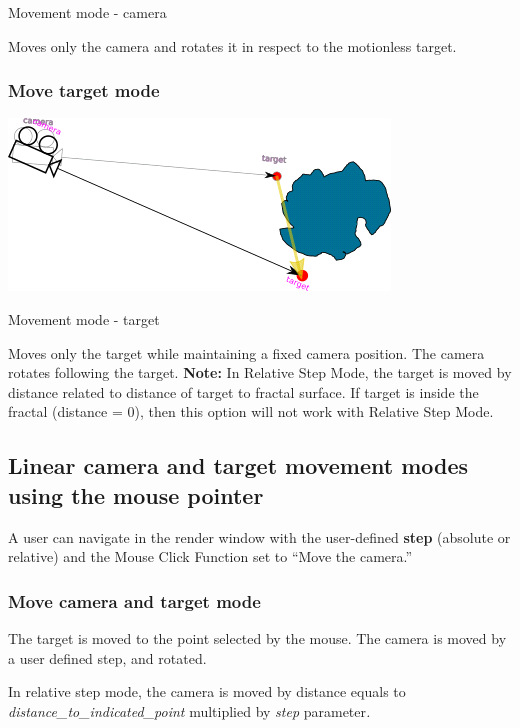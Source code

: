 Movement mode - camera

Moves only the camera and rotates it in respect to the motionless target.

\subsubsection{Move target mode}\label{move-target-mode}

\includegraphics[width=3.98819in,height=1.80208in]{img/manual/media/image13.png}

Movement mode - target

Moves only the target while maintaining a fixed camera position. The camera
rotates following the target. \textbf{Note:} In Relative Step Mode, the target
is moved by distance related to distance of target to fractal surface. If target
is inside the fractal (distance = 0), then this option will not work with
Relative Step Mode.

\subsection{Linear camera and target movement modes using the mouse
	pointer}\label{linear-camera-and-target-movement-modes-using-the-mouse-pointer}

A user can navigate in the render window with the user-defined \textbf{step}
(absolute or relative) and the Mouse Click Function set to ``Move the camera.''

\subsubsection{Move camera and target mode}\label{move-camera-and-target-mode-1}

The target is moved to the point selected by the mouse. The camera is moved by a
user defined step, and rotated.

In relative step mode, the camera is moved by distance equals to
\emph{distance\_to\_indicated\_point} multiplied by \emph{step}
parameter\emph{.}

